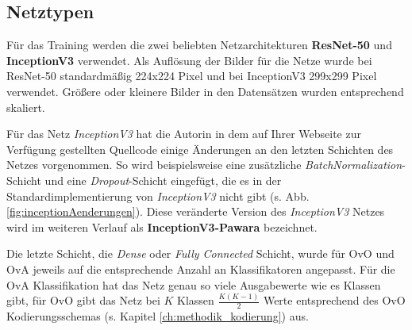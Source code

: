 \subsection{Netztypen}
\label{ch:methodik_netze}
Für das Training werden die zwei beliebten Netzarchitekturen \textbf{ResNet-50} und \textbf{InceptionV3} verwendet. Als Auflösung der Bilder für die Netze wurde bei ResNet-50 standardmäßig 224x224 Pixel und bei InceptionV3 299x299 Pixel verwendet. Größere oder kleinere Bilder in den Datensätzen wurden entsprechend skaliert.

Für das Netz \textit{InceptionV3} hat die Autorin in dem auf Ihrer Webseite zur Verfügung gestellten Quellcode \cite{pawaraWebsiteCode} einige Änderungen an den letzten Schichten des Netzes vorgenommen. So wird beispielsweise eine zusätzliche \textit{BatchNormalization}-Schicht und eine \textit{Dropout}-Schicht eingefügt, die es in der Standardimplementierung von \textit{InceptionV3} nicht gibt (s. Abb. \ref{fig:inceptionAenderungen}). Diese veränderte Version des \textit{InceptionV3} Netzes wird im weiteren Verlauf als \textbf{InceptionV3-Pawara} bezeichnet.

Die letzte Schicht, die \textit{Dense} oder \textit{Fully Connected} Schicht, wurde für OvO und OvA jeweils auf die entsprechende Anzahl an Klassifikatoren angepasst. Für die OvA Klassifikation hat das Netz genau so viele Ausgabewerte wie es Klassen gibt, für OvO gibt das Netz bei $K$ Klassen $\frac{K(K-1)}{2}$ Werte entsprechend des OvO Kodierungsschemas (s. Kapitel \ref{ch:methodik_kodierung}) aus.

